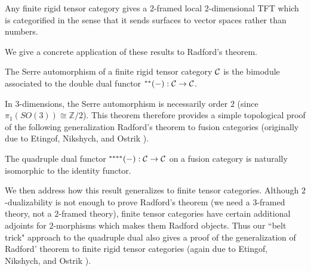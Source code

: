 \documentclass{amsart}
\begin{document}
\begin{maincor}
Any finite rigid tensor category gives a $2$-framed local $2$-dimensional TFT which is categorified in the sense that it sends surfaces to vector spaces rather than numbers.
\end{maincor}


We give a concrete application of these results to Radford's theorem.


\begin{maintheorem}
The Serre automorphism of a finite rigid tensor category $\mathcal C$ is the bimodule associated to the double dual functor ${}^{**}(-): \mathcal C \rightarrow \mathcal C$.  %
\end{maintheorem}

In $3$-dimensions, the Serre automorphism is necessarily order $2$ (since $\pi_1(SO(3)) \cong \mathbb{Z}/2$). This theorem therefore provides a simple topological proof of the following generalization Radford's theorem \cite{MR0407069} to fusion categories (originally due to Etingof, Nikshych, and Ostrik \cite{MR2183279}).
\begin{maincor}
The quadruple dual functor ${}^{****}(-): \mathcal C \rightarrow \mathcal C$ on a fusion category is naturally isomorphic to the identity functor.
\end{maincor}

We then address how this result generalizes to finite tensor categories.  Although $2$-dualizability is not enough to prove Radford's theorem  (we need a $3$-framed theory, not a $2$-framed theory), finite tensor categories have certain additional adjoints for $2$-morphisms which makes them Radford objects.  Thus our ``belt trick" approach to the quadruple dual also gives a proof of the generalization of Radford' theorem to finite rigid tensor categories (again due to Etingof, Nikshych, and Ostrik \cite{MR2097289}).
\end{document}
